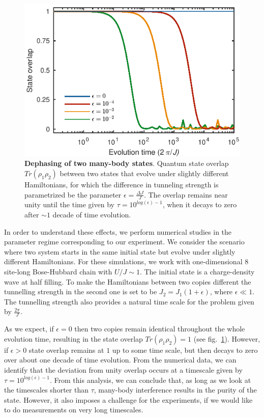 \begin{figure}[t]
	\centering
	\includegraphics[scale=1]{figures/CBH_overlap.pdf}
	\caption{{\bf Dephasing of two many-body states}. Quantum state overlap $Tr(\rho_1 \rho_2) $ between two states that evolve under slightly different Hamiltonians, for which the difference in tunneling strength is parametrized be the parameter $\epsilon = \frac{\Delta J}{J}$. The overlap remains near unity until the time given by $\tau = 10^{log(\epsilon)-1}$, when it decays to zero after $\sim 1$ decade of time evolution.}
	\label{fig:CBH_overlap}
\end{figure}

In order to understand these effects, we perform numerical studies in the parameter regime corresponding to our experiment. We consider the scenario where two system starts in the same initial state but evolve under slightly different Hamiltonians. For these simulations, we work with one-dimensional $8$ site-long Bose-Hubbard chain with $U/J\sim1$. The initial state is a charge-density wave at half filling. To make the Hamiltonians between two copies different the tunnelling strength in the second one is set to be $J_2 = J_1(1+\epsilon)$, where $\epsilon \ll 1$. The tunnelling strength also provides a natural time scale for the problem given by $\frac{2 \pi}{J}$.

As we expect, if $\epsilon = 0$ then two copies remain identical throughout the whole evolution time, resulting in the state overlap $Tr(\rho_1 \rho_2) = 1$ (see fig.~\ref{fig:CBH_overlap}). However, if $\epsilon > 0$ state overlap remains at $1$ up to some time scale, but then decays to zero over about one decade of time evolution. From the numerical data, we can identify that the deviation from unity overlap occurs at a timescale given by $\tau = 10^{log(\epsilon)-1}$. From this analysis, we can conclude that, as long as we look at the timescales shorter than $\tau$, many-body interference results in the purity of the state. However, it also imposes a challenge for the experiments, if we would like to do measurements on very long timescales.

